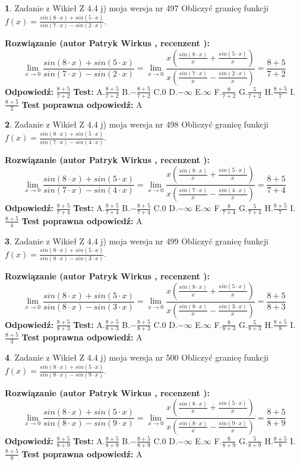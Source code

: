 \documentclass[12pt, a4paper]{article}
\theoremstyle{definition} %
\newtheorem{zad}{}
\newcommand{\zadStart}[1]{\begin{zad}#1\newline}
\newcommand{\zadStop}{\end{zad}}
\newcommand{\rozwStart}[2]{\noindent \textbf{Rozwiązanie (autor #1 , recenzent #2): }\newline}
\newcommand{\rozwStop}{\newline}
\newcommand{\odpStart}{\noindent \textbf{Odpowiedź:}\newline}
\newcommand{\odpStop}{\newline}
\newcommand{\testStart}{\noindent \textbf{Test:}\newline}
\newcommand{\testStop}{\newline}
\newcommand{\kluczStart}{\noindent \textbf{Test poprawna odpowiedź:}\newline}
\newcommand{\kluczStop}{\newline}
\begin{document}
\zadStart{Zadanie z Wikieł Z 4.4 j) moja wersja nr 497}
Obliczyć granicę funkcji $f(x)=\frac{sin(8\cdot x) +sin(5\cdot x)}{sin(7\cdot x) -sin(2\cdot x)}$.
\zadStop
\rozwStart{Patryk Wirkus}{}
$$\lim\limits_{x\to 0}\frac{sin(8\cdot x) +sin(5\cdot x)}{sin(7\cdot x) -sin(2\cdot x)}=\lim\limits_{x\to 0}\frac{x(\frac{sin(8\cdot x)}{x}+\frac{sin(5\cdot x)}{x})}{x(\frac{sin(7\cdot x)}{x}-\frac{sin(2\cdot x)}{x})}=\frac{8+5}{7+2}$$
\rozwStop
\odpStart
$\frac{8+5}{7+2}$
\odpStop
\testStart
A.$\frac{8+5}{7+2}$
B.$-\frac{8+5}{7+2}$
C.$0$
D.$-\infty$
E.$\infty$
F.$\frac{8}{7+2}$
G.$\frac{5}{7+2}$
H.$\frac{8+5}{7}$
I.$\frac{8+5}{2}$
\testStop
\kluczStart
A
\kluczStop



\zadStart{Zadanie z Wikieł Z 4.4 j) moja wersja nr 498}
Obliczyć granicę funkcji $f(x)=\frac{sin(8\cdot x) +sin(5\cdot x)}{sin(7\cdot x) -sin(4\cdot x)}$.
\zadStop
\rozwStart{Patryk Wirkus}{}
$$\lim\limits_{x\to 0}\frac{sin(8\cdot x) +sin(5\cdot x)}{sin(7\cdot x) -sin(4\cdot x)}=\lim\limits_{x\to 0}\frac{x(\frac{sin(8\cdot x)}{x}+\frac{sin(5\cdot x)}{x})}{x(\frac{sin(7\cdot x)}{x}-\frac{sin(4\cdot x)}{x})}=\frac{8+5}{7+4}$$
\rozwStop
\odpStart
$\frac{8+5}{7+4}$
\odpStop
\testStart
A.$\frac{8+5}{7+4}$
B.$-\frac{8+5}{7+4}$
C.$0$
D.$-\infty$
E.$\infty$
F.$\frac{8}{7+4}$
G.$\frac{5}{7+4}$
H.$\frac{8+5}{7}$
I.$\frac{8+5}{4}$
\testStop
\kluczStart
A
\kluczStop



\zadStart{Zadanie z Wikieł Z 4.4 j) moja wersja nr 499}
Obliczyć granicę funkcji $f(x)=\frac{sin(8\cdot x) +sin(5\cdot x)}{sin(8\cdot x) -sin(3\cdot x)}$.
\zadStop
\rozwStart{Patryk Wirkus}{}
$$\lim\limits_{x\to 0}\frac{sin(8\cdot x) +sin(5\cdot x)}{sin(8\cdot x) -sin(3\cdot x)}=\lim\limits_{x\to 0}\frac{x(\frac{sin(8\cdot x)}{x}+\frac{sin(5\cdot x)}{x})}{x(\frac{sin(8\cdot x)}{x}-\frac{sin(3\cdot x)}{x})}=\frac{8+5}{8+3}$$
\rozwStop
\odpStart
$\frac{8+5}{8+3}$
\odpStop
\testStart
A.$\frac{8+5}{8+3}$
B.$-\frac{8+5}{8+3}$
C.$0$
D.$-\infty$
E.$\infty$
F.$\frac{8}{8+3}$
G.$\frac{5}{8+3}$
H.$\frac{8+5}{8}$
I.$\frac{8+5}{3}$
\testStop
\kluczStart
A
\kluczStop



\zadStart{Zadanie z Wikieł Z 4.4 j) moja wersja nr 500}
Obliczyć granicę funkcji $f(x)=\frac{sin(8\cdot x) +sin(5\cdot x)}{sin(8\cdot x) -sin(9\cdot x)}$.
\zadStop
\rozwStart{Patryk Wirkus}{}
$$\lim\limits_{x\to 0}\frac{sin(8\cdot x) +sin(5\cdot x)}{sin(8\cdot x) -sin(9\cdot x)}=\lim\limits_{x\to 0}\frac{x(\frac{sin(8\cdot x)}{x}+\frac{sin(5\cdot x)}{x})}{x(\frac{sin(8\cdot x)}{x}-\frac{sin(9\cdot x)}{x})}=\frac{8+5}{8+9}$$
\rozwStop
\odpStart
$\frac{8+5}{8+9}$
\odpStop
\testStart
A.$\frac{8+5}{8+9}$
B.$-\frac{8+5}{8+9}$
C.$0$
D.$-\infty$
E.$\infty$
F.$\frac{8}{8+9}$
G.$\frac{5}{8+9}$
H.$\frac{8+5}{8}$
I.$\frac{8+5}{9}$
\testStop
\kluczStart
A
\kluczStop
\end{document}
